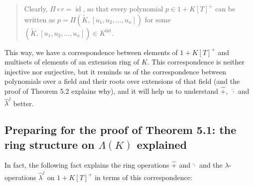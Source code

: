 \documentclass[numbers=enddot,12pt,final,onecolumn,notitlepage]{scrartcl}%
\begin{document}
\begin{quote}
Clearly, $\Pi\circ r=\operatorname*{id}$, so that every polynomial
$p\in1+K\left[  T\right]  ^{+}$ can be written as $p=\Pi\left(  \widetilde{K}%
,\left[  u_{1},u_{2},...,u_{n}\right]  \right)  $ for some $\left(
\widetilde{K},\left[  u_{1},u_{2},...,u_{n}\right]  \right)  \in
K^{\operatorname*{int}}$.
\end{quote}

This way, we have a correspondence between elements of $1+K\left[  T\right]
^{+}$ and multisets of elements of an extension ring of $K$. This
correspondence is neither injective nor surjective, but it reminds us of the
correspondence between polynomials over a field and their roots over
extensions of that field (and the proof of Theorem 5.2 explains why), and it
will help us to understand $\widehat{+},$ $\widehat{\cdot}$ and
$\widehat{\lambda}^{j}$ better.

\subsection{Preparing for the proof of Theorem 5.1: the ring structure on
$\Lambda\left(  K\right)  $ explained}

In fact, the following fact explains the ring operations $\widehat{+}$ and
$\widehat{\cdot}$ and the $\lambda$-operations $\widehat{\lambda}^{j}$ on
$1+K\left[  T\right]  ^{+}$ in terms of this correspondence:
\end{document}
